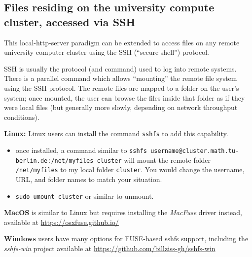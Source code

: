 
\hypertarget{simwrapper-files-residing-on-the-university-compute-cluster-accessed-via-ssh}{%
\subsection{Files residing on the university compute cluster, accessed via SSH}
\label{simwrapper-files-residing-on-the-university-compute-cluster-accessed-via-ssh}}

This local-http-server paradigm can be extended to access files on any remote university computer cluster using the SSH (``secure shell'') protocol.

SSH is usually the protocol (and command) used to log into remote systems. There is a parallel command which allows ``mounting'' the remote file system using the SSH protocol. The remote files are mapped to a folder on the user's system; once mounted, the user can browse the files inside that folder as if they were local files (but generally more slowly, depending on network throughput conditions).

\textbf{Linux:} Linux users can install the command \texttt{sshfs} to add this capability.

\begin{itemize}
\item
  once installed, a command similar to
  \texttt{sshfs\ username@cluster.math.tu-berlin.de:/net/myfiles\ cluster}
  will mount the remote folder \texttt{/net/myfiles} to my local
  folder \texttt{cluster}. You would change the username, URL, and
  folder names to match your situation.
\item
  \texttt{sudo\ umount\ cluster} or similar to unmount.
\end{itemize}

\textbf{MacOS} is similar to Linux but requires installing the \emph{MacFuse} driver instead, available at \url{https://osxfuse.github.io/}

\textbf{Windows}  users have many options for FUSE-based sshfs support, including the \emph{sshfs-win} project available at \url{https://github.com/billziss-gh/sshfs-win}


